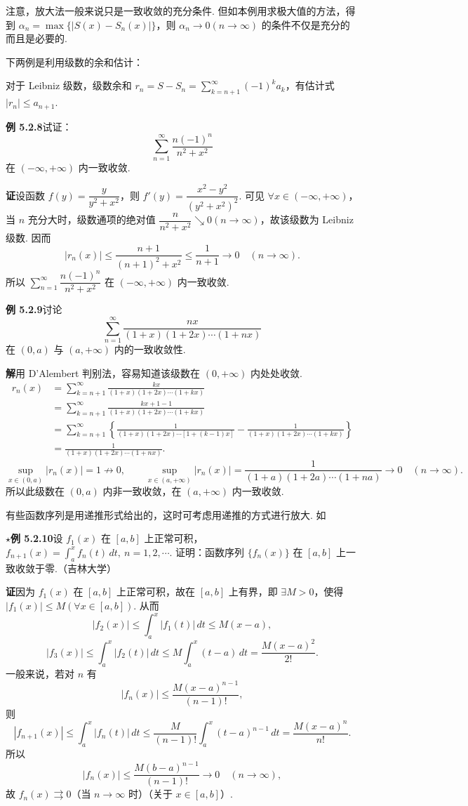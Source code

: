 \documentclass[UTF8, 12pt, fontset=fandol, oneside]{ctexart}
\begin{document}
注意，放大法一般来说只是一致收敛的充分条件. 但如本例用求极大值的方法，得到
$\alpha_n=\max\{|S(x)-S_n(x)|\}$，则 $\alpha_n\to0(n\to\infty)$ 的条件不仅是充分的而且是必要的.

下两例是利用级数的余和估计：

对于 Leibniz 级数，级数余和
$r_n=S-S_n=\displaystyle\sum_{k=n+1}^{\infty}(-1)^ka_k$，有估计式
$|r_n|\le a_{n+1}$.

\noindent\textbf{例 5.2.8}\quad 试证：
\[
  \sum_{n=1}^{\infty}\frac{n(-1)^n}{n^2+x^2}
\]
在 $(-\infty,+\infty)$ 内一致收敛.

\noindent\textbf{证}\quad 设函数 $f(y)=\dfrac{y}{y^2+x^2}$，则
$f'(y)=\dfrac{x^2-y^2}{(y^2+x^2)^2}$. 可见 $\forall x\in(-\infty,+\infty)$，当 $n$ 充分大时，级数通项的绝对值
$\dfrac{n}{n^2+x^2}\searrow0(n\to\infty)$，故该级数为 Leibniz 级数. 因而
\[
  |r_n(x)|\le\frac{n+1}{(n+1)^2+x^2}\le\frac1{n+1}\to0\quad(n\to\infty).
\]
所以 $\displaystyle\sum_{n=1}^{\infty}\dfrac{n(-1)^n}{n^2+x^2}$ 在
$(-\infty,+\infty)$ 内一致收敛.

\noindent\textbf{例 5.2.9}\quad 讨论
\[
  \sum_{n=1}^{\infty}\frac{nx}{(1+x)(1+2x)\cdots(1+nx)}
\]
在 $(0,a)$ 与 $(a,+\infty)$ 内的一致收敛性.

\noindent\textbf{解}\quad 用 D'Alembert 判别法，容易知道该级数在 $(0,+\infty)$ 内处处收敛.
\[
\begin{aligned}
r_n(x)
&=\sum_{k=n+1}^{\infty}\frac{kx}{(1+x)(1+2x)\cdots(1+kx)}\\
&=\sum_{k=n+1}^{\infty}\frac{kx+1-1}{(1+x)(1+2x)\cdots(1+kx)}\\
&=\sum_{k=n+1}^{\infty}\left\{
\frac1{(1+x)(1+2x)\cdots[1+(k-1)x]}
-\frac1{(1+x)(1+2x)\cdots(1+kx)}
\right\}\\
&=\frac1{(1+x)(1+2x)\cdots(1+nx)}.
\end{aligned}
\]
\[
  \sup_{x\in(0,a)}|r_n(x)|=1\not\to0,\qquad
  \sup_{x\in(a,+\infty)}|r_n(x)|
  =\frac1{(1+a)(1+2a)\cdots(1+na)}\to0\quad(n\to\infty).
\]
所以此级数在 $(0,a)$ 内非一致收敛，在 $(a,+\infty)$ 内一致收敛.

有些函数序列是用递推形式给出的，这时可考虑用递推的方式进行放大. 如

\noindent\textbf{$\star$例 5.2.10}\quad 设 $f_1(x)$ 在 $[a,b]$ 上正常可积，
$f_{n+1}(x)=\displaystyle\int_a^x f_n(t)\,dt,\ n=1,2,\cdots$. 证明：函数序列
$\{f_n(x)\}$ 在 $[a,b]$ 上一致收敛于零.（吉林大学）

\noindent\textbf{证}\quad 因为 $f_1(x)$ 在 $[a,b]$ 上正常可积，故在 $[a,b]$ 上有界，即
$\exists M>0$，使得 $|f_1(x)|\le M(\forall x\in[a,b])$. 从而
\[
  |f_2(x)|\le\int_a^x|f_1(t)|\,dt\le M(x-a),
\]
\[
  |f_3(x)|\le\int_a^x|f_2(t)|\,dt
  \le M\int_a^x(t-a)\,dt=\frac{M(x-a)^2}{2!}.
\]
一般来说，若对 $n$ 有
\[
  |f_n(x)|\le\frac{M(x-a)^{n-1}}{(n-1)!},
\]
则
\[
  |f_{n+1}(x)|\le\int_a^x|f_n(t)|\,dt
  \le\frac{M}{(n-1)!}\int_a^x(t-a)^{n-1}\,dt
  =\frac{M(x-a)^n}{n!}.
\]
所以
\[
  |f_n(x)|\le\frac{M(b-a)^{n-1}}{(n-1)!}\to0\quad(n\to\infty),
\]
故 $f_n(x)\rightrightarrows0$（当 $n\to\infty$ 时）（关于 $x\in[a,b]$）.
\end{document}
